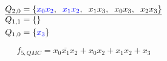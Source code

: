 \documentclass[a4paper]{article}
\begin{document}
\begin{enumerate}[label=\alph*)]
\begin{enumerate}[label=\roman*)]
\begin{align*}
			Q_{2,0} &= \{\textcolor{blue}{x_0x_2},\hspace{0.2cm}\textcolor{blue}{x_1x_2},\hspace{0.2cm} x_1x_3,\hspace{0.2cm} x_0x_3,\hspace{0.2cm}x_2x_3\}\\
			\hline
			Q_{1,1} &= \{ \}\\
			Q_{1,0} &= \{\textcolor{blue}{x_3}\}\\
		\end{align*}
		
		\begin{equation*}
		f_{5, QMC} = \overline{x_0x_1x_2} + x_0x_2 + x_1x_2 + x_3
		\end{equation*}
	\end{enumerate}
\end{enumerate}
\end{document}
